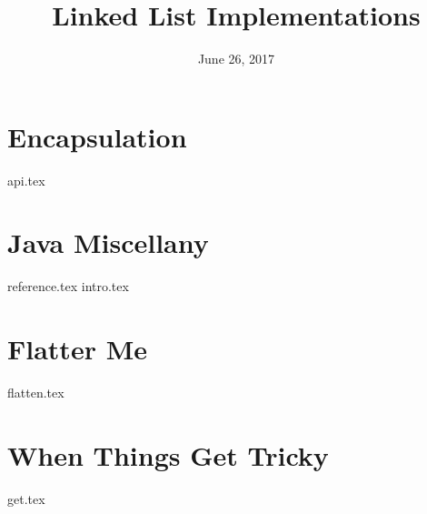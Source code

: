 \documentclass{exam}
\title{Linked List Implementations}
\date{June 26, 2017}
\begin{document}
\maketitle

\section{Encapsulation}
{api.tex}

\section{Java Miscellany}
{reference.tex}
{intro.tex}

\clearpage

\section{Flatter Me}
\begin{questions}
{flatten.tex}
\end{questions}

\section{When Things Get Tricky}
\begin{questions}
{get.tex}
\end{questions}
\end{document}
